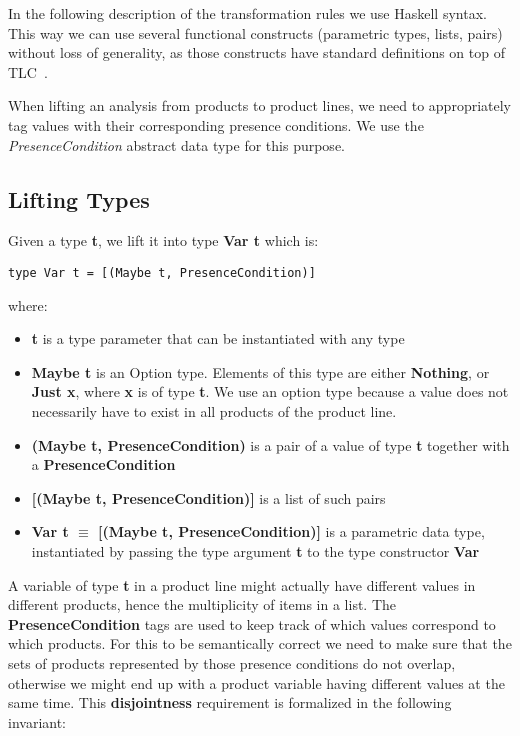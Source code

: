 \documentclass[10pt,conference]{llncs}
\begin{document}
In the following description of the transformation rules we use Haskell syntax. This way we can use several functional constructs (parametric types, lists, pairs) without loss of generality, as those constructs have standard definitions on top of TLC~\cite{Pierce2002}.

When lifting an analysis from products to product lines, we need to appropriately tag values with their corresponding presence conditions. We use the \emph{PresenceCondition} abstract data type for this purpose.

\subsection{Lifting Types}
Given a type \textbf{t}, we lift it into type \textbf{Var t} which is:

\begin{verbatim}
type Var t = [(Maybe t, PresenceCondition)]
\end{verbatim}

where:
\begin{itemize}
\item \textbf{t} is a type parameter that can be instantiated with any type
\item \textbf{Maybe t} is  an Option type. Elements of this type are either \textbf{Nothing}, or \textbf{Just x}, where \textbf{x} is of type \textbf{t}. We use an option type because a value does not necessarily have to exist in all products of the product line.
\item \textbf{(Maybe t, PresenceCondition)} is a pair of a value of type \textbf{t} together with a \textbf{PresenceCondition}
\item \textbf{[(Maybe t, PresenceCondition)]} is a list of such pairs
\item \textbf{Var t $\equiv$ [(Maybe t, PresenceCondition)]} is a parametric data type, instantiated by passing the type argument \textbf{t} to the type constructor \textbf{Var}
\end{itemize}

A variable of type \textbf{t} in a product line might actually have different values in different products, hence the multiplicity of items in a list. The \textbf{PresenceCondition} tags are used to keep track of which values correspond to which products. For this to be semantically correct we need to make sure that the sets of products represented by those presence conditions do not overlap, otherwise we might end up with a product variable having different values at the same time. This \textbf{disjointness} requirement is formalized in the following invariant:
\end{document}
